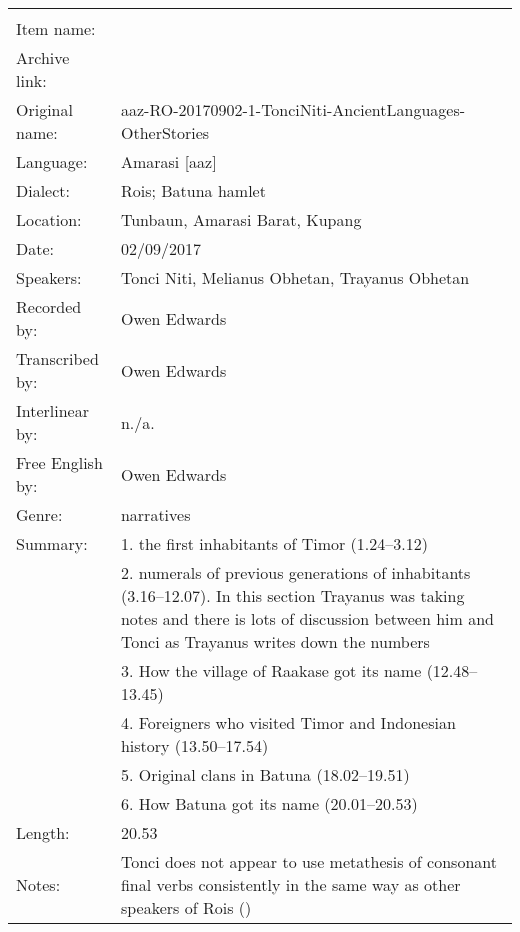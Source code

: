 \newpage
\noindent
\wg\begin{tabular}{lL{.67\textwidth}}
					& \\
Item name:			& \\
Archive link:		& \\
Original name:	& {\footnotesize aaz-RO-20170902-1-TonciNiti-AncientLanguages-OtherStories}\\
Language:				& Amarasi [aaz] \\
Dialect:				& Ro{\Q}is; Batuna hamlet \\
Location:				& Tunbaun, Amarasi Barat, Kupang \\
Date:						& 02/09/2017\\
Speakers:				& Tonci Niti, Melianus Obhetan, Trayanus Obhetan\\
Recorded by:		& Owen Edwards\\
Transcribed by:	& Owen Edwards\\
Interlinear by:	& n./a.\\
Free English by:& Owen Edwards\\
Genre:					& narratives\\
Summary:				& 1. the first inhabitants of Timor (1.24--3.12)\\
								& 2. numerals of previous generations of inhabitants (3.16--12.07).
									In this section Trayanus was taking notes and there is lots of discussion
									between him and Tonci as Trayanus writes down the numbers \\
								& 3. How the village of Raakase got its name (12.48--13.45)\\
								& 4. Foreigners who visited Timor and Indonesian history (13.50--17.54)\\
								& 5. Original clans in Batuna (18.02--19.51)\\
								& 6. How Batuna got its name (20.01--20.53)\\
Length:					& 20.53\\
Notes:					& Tonci does not appear to use metathesis of
									consonant final verbs consistently in the
									same way as other speakers of Ro{\Q}is ()\\
\end{tabular}

